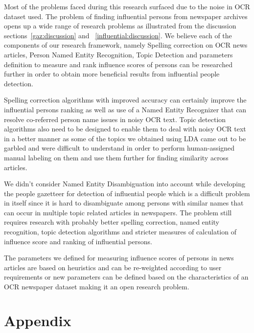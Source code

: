 \documentclass[letterpaper,11pt]{report}
\begin{document}
Most of the problems faced during this research surfaced due to the noise in OCR dataset used. The problem of finding influential persons from newspaper archives opens up a wide range of research problems as illustrated from the discussion sections~\ref{gaz:discussion} and ~\ref{influential:discussion}. 
We believe each of the components of our research framework, namely Spelling correction on OCR news articles, Person Named Entity Recognition, Topic Detection and parameters definition to measure and rank influence scores of persons can be researched further in order to obtain more beneficial results from influential people detection.

Spelling correction algorithms with improved accuracy can certainly improve the influential persons ranking as well as use of a Named Entity Recognizer that can resolve co-referred person name issues in noisy OCR text.
Topic detection algorithms also need to be designed to enable them to deal with noisy OCR text in a better manner as some of the topics we obtained using LDA came out to be garbled and were difficult to understand in order to perform human-assigned manual labeling on them and use them further for finding similarity across articles.

We didn't consider Named Entity Disambiguation into account while developing the people gazetteer for detection of influential people which is a difficult problem in itself since it is hard to disambiguate among persons with similar names that can occur in multiple topic related articles in newspapers. The problem still requires research with probably better spelling correction, named entity recognition, topic detection algorithms and stricter measures of calculation of influence score and ranking of influential persons.

 The parameters we defined for measuring influence scores of persons in news articles are based on heuristics and can be re-weighted according to user requirements or new parameters can be defined based on the characteristics of an OCR newspaper dataset making it an open research problem.
  



%

%
%


\chapter*{Appendix}\label{chapter:appendix} 
\end{document}
